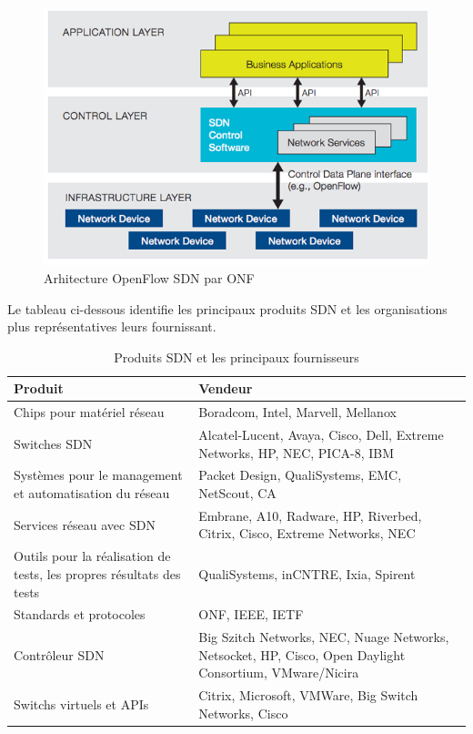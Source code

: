 \begin{figure}[!h] %
\includegraphics[width=15cm]{images/openflowArchi.png} %
\caption{ Arhitecture OpenFlow SDN par ONF \cite{SDNNewNormONFExecutiveSummary}} %
\label{imgArchi} %
\end{figure} %
 
Le tableau ci-dessous identifie les principaux produits SDN et les organisations plus représentatives leurs fournissant.

\begin{table}[!h]
\centering
\begin{tabular}{|p{6cm}|p{9cm}|}
\hline 
\bf Produit & \bf Vendeur \\ 
\hline 
Chips pour matériel réseau & Boradcom, Intel, Marvell, Mellanox \\ 
\hline 
Switches SDN & Alcatel-Lucent, Avaya, Cisco, Dell, Extreme Networks, HP, NEC, PICA-8, IBM \\ 
\hline 
Systèmes pour le management et automatisation du réseau & Packet Design, QualiSystems, EMC, NetScout, CA \\ 
\hline 
Services réseau avec SDN & Embrane, A10, Radware, HP, Riverbed, Citrix, Cisco,  Extreme Networks, NEC \\ 
\hline 
Outils pour la réalisation de tests, les propres résultats des tests & QualiSystems, inCNTRE, Ixia, Spirent \\ 
\hline 
Standards et protocoles & ONF, IEEE, IETF \\ 
\hline 
Contrôleur SDN & Big Szitch Networks, NEC, Nuage Networks, Netsocket, HP, Cisco, Open Daylight Consortium, VMware/Nicira \\ 
\hline 
Switchs virtuels et APIs & Citrix, Microsoft, VMWare, Big Switch Networks, Cisco \\ 
\hline 
\end{tabular} 
\caption{Produits SDN et les principaux fournisseurs \cite{2013GuideSDNNVEcosystem}}
\end{table} 
 
